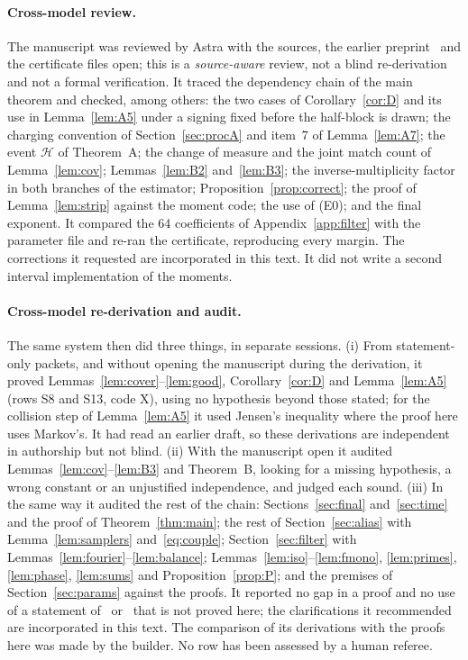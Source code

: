 \documentclass[11pt]{article}
\theoremstyle{definition}
\begin{document}
\paragraph{Cross-model review.} The manuscript was reviewed by Astra with the sources, the
earlier preprint~\cite{V} and the certificate files open; this is a \emph{source-aware} review, not a blind
re-derivation and not a formal verification. It traced the dependency chain of the main theorem and checked, among
others: the two cases of Corollary~\ref{cor:D} and its use in Lemma~\ref{lem:A5} under a signing fixed before the
half-block is drawn; the charging convention of Section~\ref{sec:procA} and item~7 of Lemma~\ref{lem:A7}; the event
$\mathcal H$ of Theorem~A; the change of measure and the joint match count of Lemma~\ref{lem:cov};
Lemmas~\ref{lem:B2} and~\ref{lem:B3}; the inverse-multiplicity factor in both branches of the estimator;
Proposition~\ref{prop:correct}; the proof of Lemma~\ref{lem:strip} against the moment code; the use of
\textup{(E0)}; and the final exponent. It compared the 64 coefficients of Appendix~\ref{app:filter} with the
parameter file and re-ran the certificate, reproducing every margin. The corrections it requested are
incorporated in this text. It did not write a second interval implementation of the moments.

\paragraph{Cross-model re-derivation and audit.} The same system then did three things, in separate sessions.
(i) From statement-only packets, and without opening the manuscript during the derivation, it proved
Lemmas~\ref{lem:cover}--\ref{lem:good}, Corollary~\ref{cor:D} and Lemma~\ref{lem:A5} (rows S8 and S13, code X),
using no hypothesis beyond those stated; for the collision step of Lemma~\ref{lem:A5} it used Jensen's inequality
where the proof here uses Markov's. It had read an earlier draft, so these derivations are independent in
authorship but not blind. (ii) With the manuscript open it audited Lemmas~\ref{lem:cov}--\ref{lem:B3} and
Theorem~B, looking for a missing hypothesis, a wrong constant or an unjustified independence, and judged each
sound. (iii) In the same way it audited the rest of the chain: Sections~\ref{sec:final} and~\ref{sec:time} and the
proof of Theorem~\ref{thm:main}; the rest of Section~\ref{sec:alias} with Lemma~\ref{lem:samplers}
and~\eqref{eq:couple}; Section~\ref{sec:filter} with Lemmas~\ref{lem:fourier}--\ref{lem:balance};
Lemmas~\ref{lem:iso}--\ref{lem:fmono}, \ref{lem:primes}, \ref{lem:phase}, \ref{lem:sums} and
Proposition~\ref{prop:P}; and the premises of Section~\ref{sec:params} against the proofs. It reported no gap in a
proof and no use of a statement of~\cite{OAI} or~\cite{Base} that is not proved here; the clarifications it
recommended are incorporated in this text. The comparison of its derivations with the proofs here was made by the
builder. No row has been assessed by a human referee.
\end{document}

